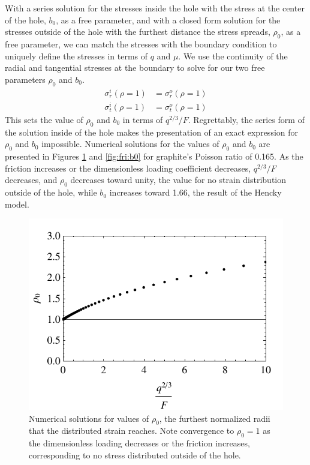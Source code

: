 With a series solution for the stresses inside the hole with the stress at the center of the hole, $b_0$, as a free parameter, and with a closed form solution for the stresses outside of the hole with the furthest distance the stress spreads, $\rho_0$, as a free parameter, we can match the stresses with the boundary condition to uniquely define the stresses in terms of $q$ and $\mu$.
We use the continuity of the radial and tangential stresses at the boundary to solve for our two free parameters $\rho_0$ and $b_0$.
\begin{align*}
	\sigma_r^i(\rho=1)&=\sigma_r^o(\rho=1) \\
	\sigma_t^i(\rho=1)&=\sigma_t^o(\rho=1) 
\end{align*}
This sets the value of $\rho_0$ and $b_0$ in terms of $q^{2/3}/F$.
Regrettably, the series form of the solution inside of the hole makes the presentation of an exact expression for $\rho_0$ and $b_0$ impossible.
Numerical solutions for the values of $\rho_0$ and $b_0$ are presented in Figures \ref{fig:fri:rho0} and \ref{fig:fri:b0} for graphite's Poisson ratio of 0.165\cite{Blakslee1970}.
As the friction increases or the dimensionless loading coefficient decreases, $q^{2/3}/F$ decreases, and $\rho_0$ decreases toward unity, the value for no strain distribution outside of the hole, while $b_0$ increases toward 1.66, the result of the Hencky model. 

\begin{figure}
	\begin{center}
	\includegraphics{Figs_Friction/rho0.pdf}
	\end{center}
	\caption[Numerical solutions for values of $\rho_0$, the furthest normalized radii that the distributed strain reaches]{\label{fig:fri:rho0} Numerical solutions for values of $\rho_0$, the furthest normalized radii that the distributed strain reaches. Note convergence to $\rho_0 = 1$ as the dimensionless loading decreases or the friction increases, corresponding to no stress distributed outside of the hole.}
\end{figure}

